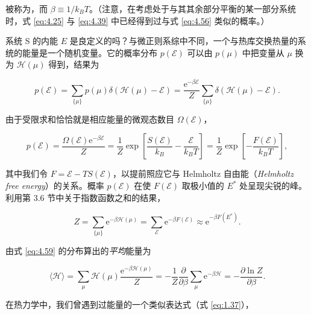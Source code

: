 被称为，而 $\beta\equiv1/k_BT$。（注意，在考虑处于与其其余部分平衡的某一部分系统时，式 \eqref{eq:4.25} 与 \eqref{eq:4.39} 中已经得到过与式 \eqref{eq:4.56} 类似的概率。）

系统 S 的内能 $E$ 是良定义的吗？与微正则系综中不同，一个与热库交换热量的系统的能量是一个随机变量。它的概率分布 $p(\mathcal{E})$ 可以由 $p(\mu)$ 中把变量从 $\mu$ 换为 $\mathscr H(\mu)$ 得到，结果为

\begin{equation}\label{eq:4.58}
  p(\mathcal{E})=\sum_{\{\mu\}}p(\mu)\delta\left(\mathscr H(\mu)-\mathcal{E}\right)=\frac{\mathrm{e}^{-\beta\mathcal{E}}}{Z}\sum_{\{\mu\}}\delta\left(\mathscr H(\mu)-\mathcal{E}\right).
\end{equation}

由于受限求和恰恰就是相应能量的微观态数目 $\Omega(\mathcal{E})$，

\begin{equation}\label{eq:4.59}
  p(\mathcal{E})=\frac{\Omega(\mathcal{E})\mathrm{e}^{-\beta\mathcal{E}}}{Z}=\frac{1}{Z}\exp\left[\frac{S(\mathcal{E})}{k_B}-\frac{\mathcal{E}}{k_BT}\right]=\frac{1}{Z}\exp\left[-\frac{F(\mathcal{E})}{k_BT}\right],
\end{equation}

其中我们令 $F=\mathcal{E}-TS(\mathcal{E})$，以提前照应它与 Helmholtz 自由能（\textit{Helmholtz free energy}）的关系。概率 $p(\mathcal{E})$ 在使 $F(\mathcal{E})$ 取极小值的 $E^*$ 处呈现尖锐的峰。利用第 3.6 节中关于指数函数之和的结果，

\begin{equation}\label{eq:4.60}
  Z=\sum_{\{\mu\}}\mathrm{e}^{-\beta\mathscr H(\mu)}=\sum_{\mathcal{E}}\mathrm{e}^{-\beta F(\mathcal{E})}\approx\mathrm{e}^{-\beta F(E^*)}.
\end{equation}

由式 \eqref{eq:4.59} 的分布算出的\emph{平均}能量为

\begin{equation}\label{eq:4.61}
  \langle\mathscr H\rangle=\sum_\mu\mathscr H(\mu)\frac{\mathrm{e}^{-\beta\mathscr H(\mu)}}{Z}=-\frac{1}{Z}\frac{\partial}{\partial\beta}\sum_\mu\mathrm{e}^{-\beta\mathscr H}=-\frac{\partial\ln Z}{\partial\beta}.
\end{equation}


在热力学中，我们曾遇到过能量的一个类似表达式（式 \eqref{eq:1.37}），

